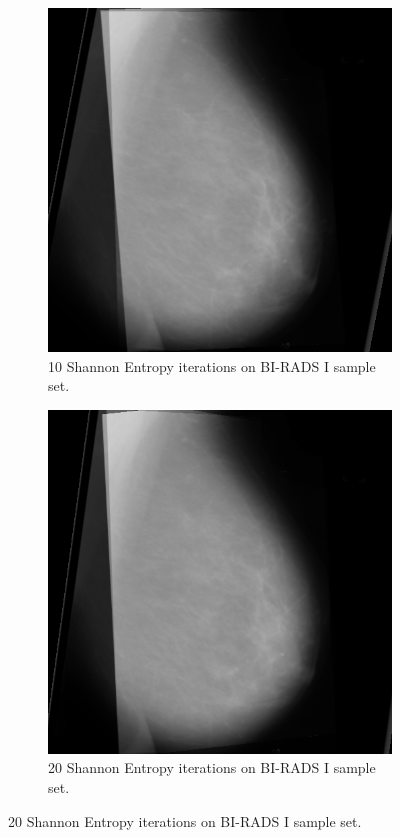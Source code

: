 \begin{figure}[H]
\begin{subfigure}[t]{0.3\textwidth}
        \includegraphics[width=\textwidth]{Chapter3/shannon-img/s-10-final.png}
        \caption{10 Shannon Entropy iterations on BI-RADS I sample set.}
        \label{fig:10-shannon}
    \end{subfigure} \hfill
    \begin{subfigure}[t]{0.3\textwidth}
      \includegraphics[width=\textwidth]{Chapter3/shannon-img/shannon-20.png}
      \caption{20 Shannon Entropy iterations on BI-RADS I sample set.}
      \label{fig:20-shannon}
    \end{subfigure}
\end{figure}


